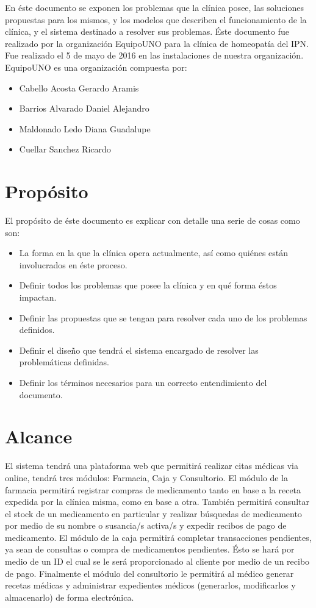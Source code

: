 

En \'este documento se exponen los problemas que la cl\'inica posee, las soluciones propuestas para los mismos, y los modelos que describen el funcionamiento de la cl\'inica, y el sistema destinado a resolver sus problemas. 
\'Este documento fue realizado por la organizaci\'on EquipoUNO para la cl\'inica de homeopat\'ia del IPN. Fue realizado el 5 de mayo de 2016 en las instalaciones de nuestra organizaci\'on.
EquipoUNO es una organizaci\'on compuesta por:
\begin{itemize}
\item Cabello Acosta Gerardo Aramis
\item Barrios Alvarado Daniel Alejandro
\item Maldonado Ledo Diana Guadalupe
\item Cuellar Sanchez Ricardo
\end{itemize}

\section{Propósito}
El prop\'osito de \'este documento es explicar con detalle una serie de cosas como son:
\begin{itemize}
\item La forma en la que la cl\'inica opera actualmente, as\'i como qui\'enes est\'an involucrados en \'este proceso.
\item Definir todos los problemas que posee la cl\'inica y en qu\'e forma \'estos impactan.
\item Definir las propuestas que se tengan para resolver cada uno de los problemas definidos.
\item Definir el diseño que tendr\'a el sistema encargado de resolver las problem\'aticas definidas.
\item Definir los t\'erminos necesarios para un correcto entendimiento del documento.
\end{itemize}

\section{Alcance}
El sistema tendr\'a una plataforma web que permitir\'a realizar citas m\'edicas via online, tendr\'a tres m\'odulos: Farmacia, Caja y Consultorio. 
El m\'odulo de la farmacia permitir\'a registrar compras de medicamento tanto en base a la receta expedida por la cl\'inica misma, como en base a otra. Tambi\'en permitir\'a consultar el stock de un medicamento en particular y realizar b\'usquedas de medicamento por medio de su nombre o susancia/s activa/s y expedir recibos de pago de medicamento.
El m\'odulo de la caja permitir\'a completar transacciones pendientes, ya sean de consultas o compra de medicamentos pendientes. \'Esto se har\'a por medio de un ID el cual se le ser\'a proporcionado al cliente por medio de un recibo de pago.
Finalmente el m\'odulo del consultorio le permitir\'a al m\'edico generar recetas m\'edicas y administrar expedientes m\'edicos (generarlos, modificarlos y almacenarlo) de forma electr\'onica.


